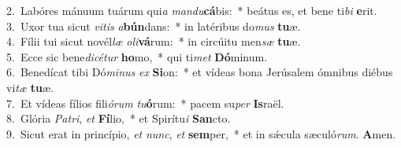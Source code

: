 {2.~}Labóres mánuum tuárum qui\textit{a} \textit{man}\textit{du}\textbf{cá}bis:~* beátus es, et bene ti\textit{bi} \textbf{e}rit.\\
{3.~}Uxor tua sicut \textit{vi}\textit{tis} \textit{a}\textbf{bún}dans:~* in latéribus do\textit{mus} \textbf{tu}æ.\\
{4.~}Fílii tui sicut novél\textit{læ} \textit{o}\textit{li}\textbf{vá}rum:~* in circúitu men\textit{sæ} \textbf{tu}æ.\\
{5.~}Ecce sic bene\textit{di}\textit{cé}\textit{tur} \textbf{ho}mo,~* qui ti\textit{met} \textbf{Dó}minum.\\
{6.~}Benedícat tibi Dó\textit{mi}\textit{nus} \textit{ex} \textbf{Si}on:~* et vídeas bona Jerúsalem ómnibus diébus vi\textit{tæ} \textbf{tu}æ.\\
{7.~}Et vídeas fílios fili\textit{ó}\textit{rum} \textit{tu}\textbf{ó}rum:~* pacem su\textit{per} \textbf{Is}raël.\\
{8.~}Glória \textit{Pa}\textit{tri}, \textit{et} \textbf{Fí}lio,~* et Spirítu\textit{i} \textbf{San}cto.\\
{9.~}Sicut erat in princípio, \textit{et} \textit{nunc}, \textit{et} \textbf{sem}per,~* et in sǽcula sæculó\textit{rum}. \textbf{A}men.\\
